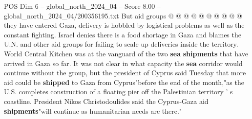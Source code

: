 \begin{textsample}{POS Dim 6 – global\_north\_2024\_04 – Score 8.00 – global\_north\_2024\_04/200356195.txt}
But aid groups @ @ @ @ @ @ @ @ @ @ they have entered Gaza, delivery is hobbled by logistical problems as well as the constant fighting.
Israel denies there is a food shortage in Gaza and blames the U.N. and other aid groups for failing to scale up deliveries inside the territory.
World Central Kitchen was at the vanguard of the two \textbf{sea} \textbf{shipments} that have arrived in Gaza so far.
It was not clear in what capacity the \textbf{sea} corridor would continue without the group, but the president of Cyprus said Tuesday that more aid could be \textbf{shipped} to Gaza from Cyprus"before the end of the month,"as the U.S. completes construction of a floating pier off the Palestinian territory ' s coastline.
President Nikos Christodoulides said the Cyprus-Gaza aid \textbf{shipments}"will continue as humanitarian needs are there."

\end{textsample}

